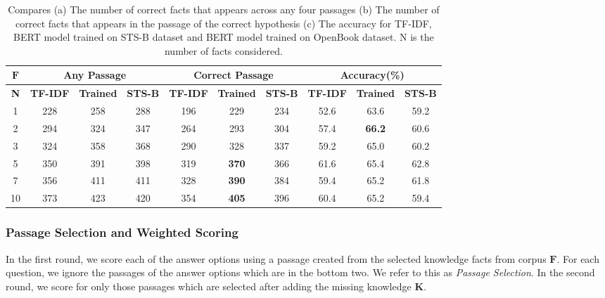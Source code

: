 \documentclass[11pt,a4paper]{article}
\begin{document}
\begin{table*}[!t]
\centering
\begin{tabular}{|c|ccc|ccc|ccc|}
\hline
$\mathbf{F}$& \multicolumn{3}{c|}{\textbf{Any Passage}} & \multicolumn{3}{c|}{ \textbf{Correct Passage}} & \multicolumn{3}{c|}{\textbf{Accuracy(\%)}} \\
\hline
\textbf{N} &\textbf{TF-IDF}&\textbf{Trained}&\textbf{STS-B}&\textbf{TF-IDF}&\textbf{Trained}&\textbf{STS-B}&\textbf{TF-IDF}&\textbf{Trained}&\textbf{STS-B}\\
\hline
1&228&258&288&196&229&234&52.6&63.6&59.2\\
2&294&324&347&264&293&304&57.4&\textbf{66.2}&60.6\\
3&324&358&368&290&328&337&59.2&65.0&60.2\\
5&350&391&398&319&\textbf{370}&366&61.6&65.4&62.8\\
7&356&411&411&328&\textbf{390}&384&59.4&65.2&61.8\\
10&373&423&420&354&\textbf{405}&396&60.4&65.2&59.4\\
\hline
\end{tabular}
\caption{Compares (a) The number of correct facts that appears across any four passages (b) The number of correct facts that appears in the passage of the correct hypothesis (c) The accuracy for TF-IDF, BERT model trained on STS-B dataset and BERT model trained on OpenBook dataset. N is the number of facts considered.
  }
\label{exp:f1}
\end{table*}
\subsubsection{Passage Selection and Weighted Scoring}
In the first round,  we score each of the answer options using a passage created from the selected knowledge facts from corpus $\mathbf{F}$. For each question, we ignore the passages of the answer options which are in the bottom two. We refer to this as \textit{Passage Selection}. In the second round, we score for only those passages which are selected after adding the missing knowledge $\mathbf{K}$.
\end{document}
